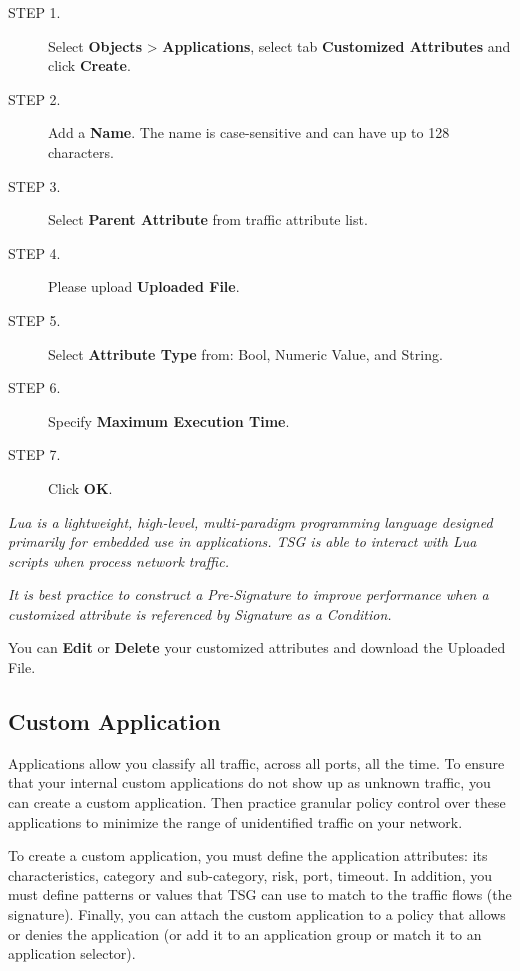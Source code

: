 \begin{description}
    \item[STEP 1.]	Select \textbf{Objects} > \textbf{Applications}, select tab \textbf{Customized Attributes} and click \textbf{Create}.
    \item[STEP 2.]	Add a \textbf{Name}. The name is case-sensitive and can have up to 128 characters.
    \item[STEP 3.]	Select \textbf{Parent Attribute} from traffic attribute list.
    \item[STEP 4.]	Please upload \textbf{Uploaded File}.
    \item[STEP 5.]	Select \textbf{Attribute Type} from: Bool, Numeric Value, and String.
    \item[STEP 6.]	Specify \textbf{Maximum Execution Time}.
    \item[STEP 7.]	Click \textbf{OK}.
\end{description}

\notemark\textit{Lua is a lightweight, high-level, multi-paradigm programming language designed primarily for embedded use in applications. TSG is able to interact with Lua scripts when process network traffic.}	


\notemark\textit{It is best practice to construct a Pre-Signature to improve performance when a customized attribute is referenced by Signature as a Condition.} 


You can \textbf{Edit} or \textbf{Delete} your customized attributes and download the Uploaded File.

\subsection*{\hypertarget{link:Custom Application}{Custom Application}}
\label{sec:objects:application:customize}

Applications allow you classify all traffic, across all ports, all the time. To ensure that your internal custom applications do not show up as unknown traffic, you can create a custom application. Then practice granular policy control over these applications to minimize the range of unidentified traffic on your network. 


To create a custom application, you must define the application attributes: its characteristics, category and sub-category, risk, port, timeout. In addition, you must define patterns or values that TSG can use to match to the traffic flows (the signature). Finally, you can attach the custom application to a policy that allows or denies the application (or add it to an application group or match it to an application selector).


